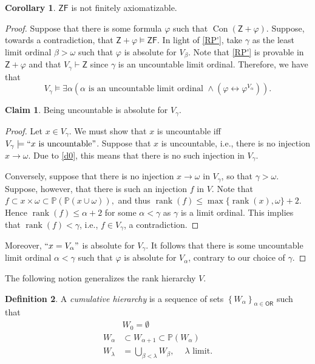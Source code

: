 \documentclass[10pt,letterpaper,cm]{nupset}
\theoremstyle{definition}
\newtheorem{definition}{Definition}[subsection]
\theoremstyle{theorem}
\newtheorem{corollary}[definition]{Corollary}
\newtheorem*{claim}{Claim}
\theoremstyle{remark}
\renewcommand{\P}{\mathbb P}
\newcommand{\1}{\mathbf{1}}
\newcommand{\0}{\vec 0}
\newcommand{\z}{\mathsf{Z}}
\newcommand{\zf}{\mathsf{ZF}}
\newcommand{\ord}{\mathsf{OR}}
\DeclareMathOperator{\rnk}{rank}
\DeclareMathOperator{\con}{Con}
\begin{document}
\begin{corollary}
$\zf$ is not finitely axiomatizable.
\end{corollary}
\begin{proof}
Suppose that there is some formula $\varphi$ such that $\con(\z +\varphi)$. Suppose, towards a contradiction, that $\z + \varphi \models \zf$. In light of \cref{RP'}, take $\gamma$ as the least limit ordinal $\beta >\omega$ such that $\varphi$ is absolute for $V_{\beta}$. Note that \cref{RP'} is provable in $\z + \varphi$ and that $V_{\gamma} \vdash \z$ since $\gamma$ is an uncountable limit ordinal. Therefore, we have that 
\[ V_{\gamma} \models \exists{\alpha}\left(\alpha \text{ is an uncountable limit ordinal } \land \left(\varphi \leftrightarrow \varphi^{V_{\alpha}}\right)\right) .\]
\begin{claim}
Being uncountable is absolute for $V_{\gamma}$.
\end{claim}
\begin{proof}
Let $x\in V_{\gamma}$. We must show that $x$ is uncountable iff $V_{\gamma} \models ``x \text{ is uncountable}"$. Suppose that $x$ is uncountable, i.e., there is no injection $x \to \omega$. Due to \cref{d0},  this means that there is no such injection in $V_{\gamma}$. 
\smallskip

Conversely, suppose that there is no injection $x \to \omega$ in $V_{\gamma}$, so that $\gamma > \omega$. Suppose, however, that there is such an injection $f$ in $V$. Note that $f\subset x\times \omega \subset \P(\P(x \cup \omega)),$ and thus $\rnk(f)\leq \max\{\rnk(x), \omega\} +2$. Hence $\rnk(f)\leq \alpha +2$ for some $\alpha <\gamma$ as $\gamma$ is a limit ordinal. This implies that $\rnk(f) <\gamma$, i.e., $f\in V_{\gamma}$, a contradiction.
\end{proof}
 Moreover, $``x= V_{\alpha}"$ is absolute for $V_{\gamma}$. It follows that there is some uncountable limit ordinal $\alpha < \gamma$ such that $\varphi$ is absolute for $V_{\alpha}$, contrary to our choice of $\gamma$.
\end{proof}

\smallskip

The following notion generalizes the rank hierarchy $V$.

\begin{definition}
A \textit{cumulative hierarchy} is a sequence of sets $\left\{W_{\alpha}\right\}_{\alpha \in \ord}$ such that
\begin{align*}
 & W_0 =\emptyset
\\ W_{\alpha}& \subset  W_{\alpha +1}\subset \P(W_{\alpha})
\\  W_{\lambda} & = \bigcup_{\beta < \lambda} W_{\beta},\ \quad \lambda \text{ limit}.
\end{align*} 
\end{definition}
\end{document}
